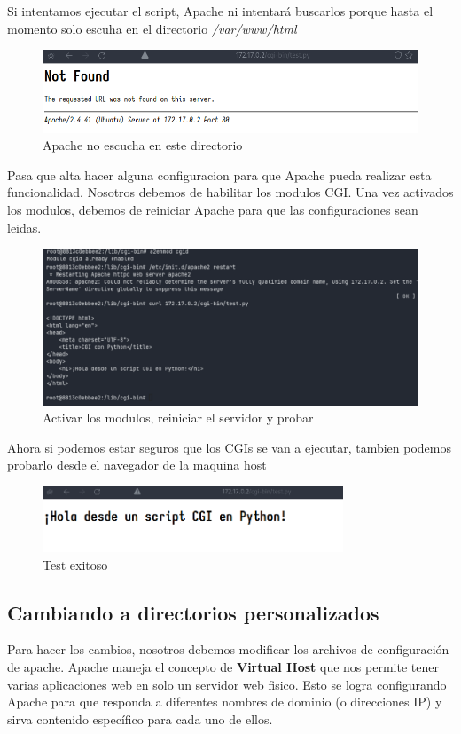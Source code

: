 Si intentamos ejecutar el script, Apache ni intentará buscarlos porque hasta el momento solo escuha en el directorio \textit{/var/www/html}
\begin{figure}[H]
  \centering
  \includegraphics[width=1.0\textwidth]{img/test_error.png}
  \caption{Apache no escucha en este directorio}
\end{figure}

Pasa que alta hacer alguna configuracion para que Apache pueda realizar esta funcionalidad. Nosotros debemos de habilitar los modulos CGI. Una vez activados los modulos, debemos de reiniciar Apache para que las configuraciones sean leidas.

\begin{figure}[H]
  \centering
  \includegraphics[width=1.0\textwidth]{img/restart.png}
  \caption{Activar los modulos, reiniciar el servidor y probar}
\end{figure}

Ahora si podemos estar seguros que los CGIs se van a ejecutar, tambien podemos probarlo desde el navegador de la maquina host

\begin{figure}[H]
  \centering
  \includegraphics[width=0.8\textwidth]{img/test.png}
  \caption{Test exitoso}
\end{figure}

\subsection{Cambiando a directorios personalizados}
Para hacer los cambios, nosotros debemos modificar los archivos de configuración de apache. Apache 
maneja el concepto de \textbf{Virtual Host} que nos permite tener varias aplicaciones web en solo un servidor 
web fisico. Esto se logra configurando Apache para que responda a diferentes nombres de dominio (o direcciones IP) y sirva contenido específico para cada uno de ellos.\\

